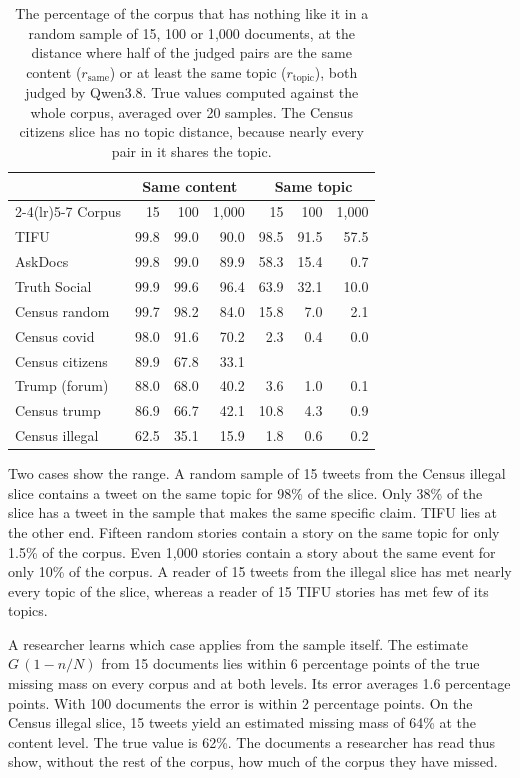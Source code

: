 \begin{table}[t]
\centering
\small
\setlength{\tabcolsep}{4pt}
\begin{tabular}{lrrrrrr}
\toprule
 & \multicolumn{3}{c}{Same content} & \multicolumn{3}{c}{Same topic} \\
\cmidrule(lr){2-4}\cmidrule(lr){5-7}
Corpus & 15 & 100 & 1{,}000 & 15 & 100 & 1{,}000 \\
\midrule
TIFU & 99.8 & 99.0 & 90.0 & 98.5 & 91.5 & 57.5 \\
AskDocs & 99.8 & 99.0 & 89.9 & 58.3 & 15.4 & 0.7 \\
Truth Social & 99.9 & 99.6 & 96.4 & 63.9 & 32.1 & 10.0 \\
Census random & 99.7 & 98.2 & 84.0 & 15.8 & 7.0 & 2.1 \\
Census covid & 98.0 & 91.6 & 70.2 & 2.3 & 0.4 & 0.0 \\
Census citizens & 89.9 & 67.8 & 33.1 & & & \\
Trump (forum) & 88.0 & 68.0 & 40.2 & 3.6 & 1.0 & 0.1 \\
Census trump & 86.9 & 66.7 & 42.1 & 10.8 & 4.3 & 0.9 \\
Census illegal & 62.5 & 35.1 & 15.9 & 1.8 & 0.6 & 0.2 \\
\bottomrule
\end{tabular}
\caption{The percentage of the corpus that has nothing like it in a random sample of 15, 100 or 1{,}000 documents, at the distance where half of the judged pairs are the same content ($r_{\mathrm{same}}$) or at least the same topic ($r_{\mathrm{topic}}$), both judged by Qwen3.8. True values computed against the whole corpus, averaged over 20 samples. The Census citizens slice has no topic distance, because nearly every pair in it shares the topic.}
\label{tab:reader}
\end{table}

Two cases show the range. A random sample of 15 tweets from the Census illegal slice contains a tweet on the same topic for 98\% of the slice. Only 38\% of the slice has a tweet in the sample that makes the same specific claim. TIFU lies at the other end. Fifteen random stories contain a story on the same topic for only 1.5\% of the corpus. Even 1{,}000 stories contain a story about the same event for only 10\% of the corpus. A reader of 15 tweets from the illegal slice has met nearly every topic of the slice, whereas a reader of 15 TIFU stories has met few of its topics.

A researcher learns which case applies from the sample itself. The estimate $G\,(1-n/N)$ from 15 documents lies within 6 percentage points of the true missing mass on every corpus and at both levels. Its error averages 1.6 percentage points. With 100 documents the error is within 2 percentage points. On the Census illegal slice, 15 tweets yield an estimated missing mass of 64\% at the content level. The true value is 62\%. The documents a researcher has read thus show, without the rest of the corpus, how much of the corpus they have missed.

